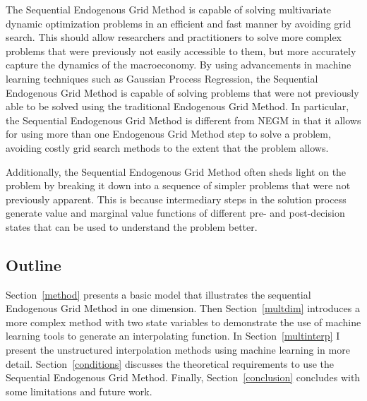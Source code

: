 \documentclass{article}
\begin{document}


The Sequential Endogenous Grid Method is capable of solving multivariate dynamic optimization problems in an efficient and fast manner by avoiding grid search. This should allow researchers and practitioners to solve more complex problems that were previously not easily accessible to them, but more accurately capture the dynamics of the macroeconomy. By using advancements in machine learning techniques such as Gaussian Process Regression, the Sequential Endogenous Grid Method is capable of solving problems that were not previously able to be solved using the traditional Endogenous Grid Method. In particular, the Sequential Endogenous Grid Method is different from NEGM in that it allows for using more than one Endogenous Grid Method step to solve a problem, avoiding costly grid search methods to the extent that the problem allows.

Additionally, the Sequential Endogenous Grid Method often sheds light on the problem by breaking it down into a sequence of simpler problems that were not previously apparent. This is because intermediary steps in the solution process generate value and marginal value functions of different pre- and post-decision states that can be used to understand the problem better.


\subsection{Outline}\label{Outline}


Section~\ref{method} presents a basic model that illustrates the sequential Endogenous Grid Method in one dimension. Then Section~\ref{multdim} introduces a more complex method with two state variables to demonstrate the use of machine learning tools to generate an interpolating function. In Section~\ref{multinterp} I present the unstructured interpolation methods using machine learning in more detail. Section~\ref{conditions} discusses the theoretical requirements to use the Sequential Endogenous Grid Method. Finally, Section~\ref{conclusion} concludes with some limitations and future work.
\end{document}
